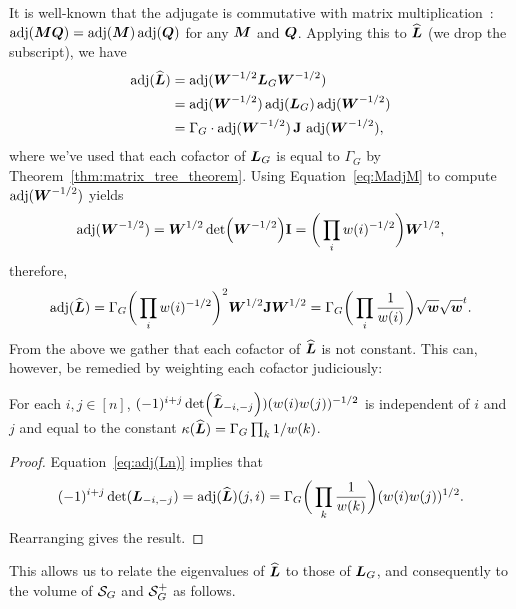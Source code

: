 It is well-known  that the adjugate is commutative with matrix multiplication~\cite{godsil2013algebraic}: $\operatorname{\textnormal{adj}}({\vb*{M}}\vb*{Q}) = \operatorname{\textnormal{adj}}({\vb*{M}})\operatorname{\textnormal{adj}}(\vb*{Q})$ for any ${\vb*{M}}$ and  $\vb*{Q}$. Applying this  to $\widehat{\vb*{L}}$ (we drop the subscript), we have 
\begin{align*}
\operatorname{\textnormal{adj}}(\widehat{\vb*{L}}) &= \operatorname{\textnormal{adj}}(\vb*{W}^{-1/2}\vb*{L}_G\vb*{W}^{-1/2}) \\
&= \operatorname{\textnormal{adj}}(\vb*{W}^{-1/2})\operatorname{\textnormal{adj}}(\vb*{L}_G)\operatorname{\textnormal{adj}}(\vb*{W}^{-1/2}) \\
&= \Gamma_G \cdot \operatorname{\textnormal{adj}}(\vb*{W}^{-1/2})\,\vb{J}\,\operatorname{\textnormal{adj}}(\vb*{W}^{-1/2}),
\end{align*}
where we've used that each cofactor of $\vb*{L}_G$ is  equal  to  $\Gamma_G$ by  Theorem~\ref{thm:matrix_tree_theorem}. Using Equation~\eqref{eq:MadjM} to compute $\operatorname{\textnormal{adj}}(\vb*{W}^{-1/2})$ yields
\begin{align*}
\operatorname{\textnormal{adj}}(\vb*{W}^{-1/2}) = \vb*{W}^{1/2} \det(\vb*{W}^{-1/2}) \vb{I} = \bigg(\prod_i w(i)^{-1/2}\bigg) \vb*{W}^{1/2},
\end{align*}
therefore, 
\begin{align}
\operatorname{\textnormal{adj}}(\widehat{\vb*{L}})  = \Gamma_G \bigg(\prod_i w(i)^{-1/2}\bigg)^2 \vb*{W}^{1/2} \vb{J}\vb*{W}^{1/2}  = \Gamma_G \bigg(\prod_i \frac{1}{w(i)} \bigg) \sqrt{\vb*{w}}\sqrt{\vb*{w}}^t.
\label{eq:adj(Ln)}
\end{align}
From the above we gather that each cofactor of $\widehat{\vb*{L}}$  is not constant. This can, however, be remedied by weighting  each  cofactor judiciously: 

\begin{lemma}
	\label{lem:adjLn_constant}
	For each $i,j\in[n]$, $(-1)^{i+j}\det(\widehat{\vb*{L}}_{-i,-j}))(w(i)w(j))^{-1/2}$ is independent of $i$  and $j$  and equal to the  constant $\kappa(\widehat{\vb*{L}}) = \Gamma_G\prod_k 1/w(k)$. 
\end{lemma}
\begin{proof}
	Equation~\eqref{eq:adj(Ln)} implies that  \[(-1)^{i+j}\det(\vb*{L}_{-i,-j})=\operatorname{\textnormal{adj}}(\widehat{\vb*{L}})(j,i) = \Gamma_G\bigg(\prod_k \frac{1}{w(k)}\bigg) (w(i)w(j))^{1/2}.\] Rearranging gives the result.  
\end{proof}


This allows us to relate the  eigenvalues of $\widehat{\vb*{L}}$ to those of $\vb*{L}_G$, and consequently to the volume of $\mathcal{S}_G$  and  $\mathcal{S}_G^+$  as  follows. 

